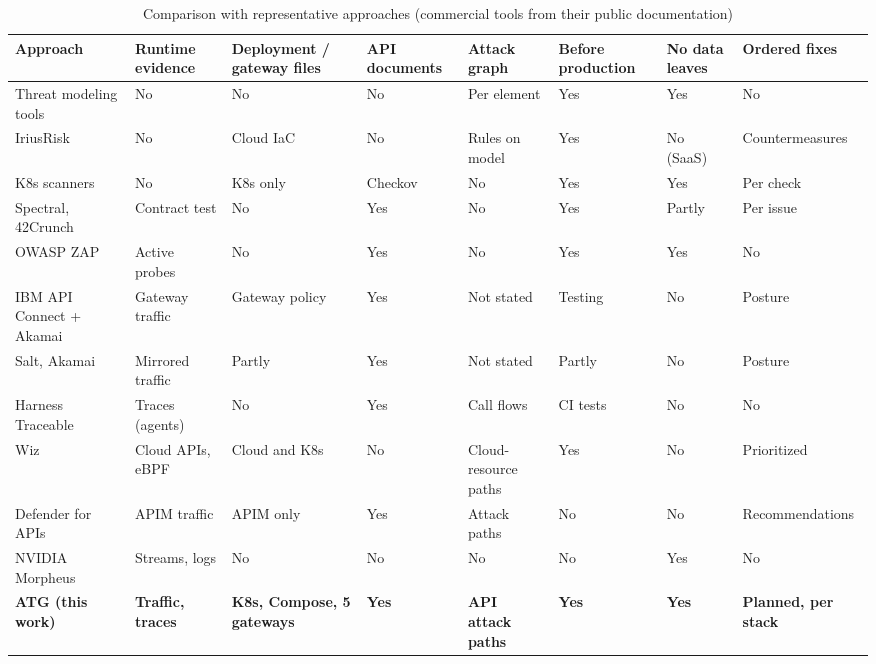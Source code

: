 \documentclass[conference]{IEEEtran}
\begin{document}
\begin{table}[t]
\caption{Comparison with representative approaches (commercial tools from their public documentation)}
\label{tab:related}
\centering
\scriptsize
\setlength{\tabcolsep}{3pt}
\begin{tabular}{@{}p{3.3cm}>{\centering\arraybackslash}p{1.75cm}>{\centering\arraybackslash}p{2.0cm}>{\centering\arraybackslash}p{1.1cm}>{\centering\arraybackslash}p{2.0cm}>{\centering\arraybackslash}p{1.35cm}>{\centering\arraybackslash}p{1.35cm}>{\centering\arraybackslash}p{1.8cm}@{}}
\toprule
Approach & Runtime evidence & Deployment / gateway files & API documents & Attack graph & Before production & No data leaves & Ordered fixes \\
\midrule
Threat modeling tools \cite{ms_tmt,threat_dragon,threagile} & No & No & No & Per element & Yes & Yes & No \\
IriusRisk \cite{iriusrisk} & No & Cloud IaC & No & Rules on model & Yes & No (SaaS) & Countermeasures \\
K8s scanners \cite{checkov,kubescape,kubelinter,polaris} & No & K8s only & Checkov & No & Yes & Yes & Per check \\
Spectral, 42Crunch \cite{spectral,crunch42} & Contract test & No & Yes & No & Yes & Partly & Per issue \\
OWASP ZAP \cite{zap} & Active probes & No & Yes & No & Yes & Yes & No \\
IBM API Connect + Akamai \cite{ibm_apic} & Gateway traffic & Gateway policy & Yes & Not stated & Testing & No & Posture \\
Salt, Akamai \cite{salt,akamai_api} & Mirrored traffic & Partly & Yes & Not stated & Partly & No & Posture \\
Harness Traceable \cite{traceable} & Traces (agents) & No & Yes & Call flows & CI tests & No & No \\
Wiz \cite{wiz} & Cloud APIs, eBPF & Cloud and K8s & No & Cloud-resource paths & Yes & No & Prioritized \\
Defender for APIs \cite{defender_apis} & APIM traffic & APIM only & Yes & Attack paths & No & No & Recommendations \\
NVIDIA Morpheus \cite{morpheus} & Streams, logs & No & No & No & No & Yes & No \\
\textbf{ATG (this work)} & \textbf{Traffic, traces} & \textbf{K8s, Compose, 5 gateways} & \textbf{Yes} & \textbf{API attack paths} & \textbf{Yes} & \textbf{Yes} & \textbf{Planned, per stack} \\
\bottomrule
\end{tabular}
\end{table}
\end{document}
